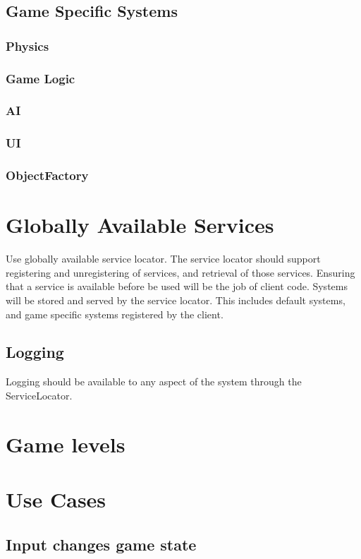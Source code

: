 \documentclass[12pt]{article}
\begin{document}
\subsection{Game Specific Systems}

\subsubsection{	Physics}
\subsubsection{	Game Logic}
\subsubsection{	AI}
\subsubsection{	UI}
\subsubsection{	ObjectFactory}

\section{ Globally Available Services}
Use globally available service locator.  The service locator should support registering and unregistering of services, and retrieval of those services.  Ensuring that a service is available before be used will be the job of client code.  Systems will be stored and served by the service locator.  This includes default systems, and game specific systems registered by the client.

\subsection{ Logging }
Logging should be available to any aspect of the system through the ServiceLocator.



\section{	Game levels}

\section{Use Cases}
\subsection{Input changes game state}
\end{document}

